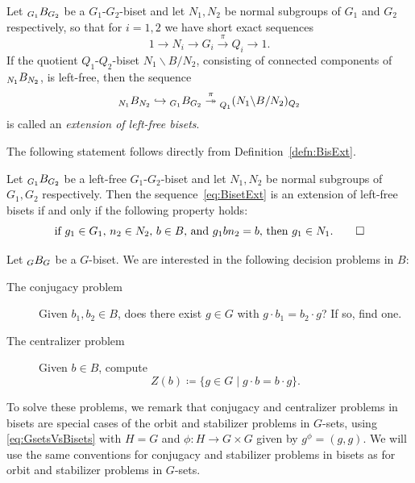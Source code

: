 \documentclass{amsart}
\begin{document}
\begin{defn}\label{defn:BisExt}
  Let $\subscript{G_1}B_{G_2}$ be a $G_1$-$G_2$-biset and let $N_1,N_2$ be
  normal subgroups of $G_1$ and $G_2$ respectively, so that for
  $i=1,2$ we have short exact sequences
  \begin{equation}\label{eq:ExtGr12}
    1\longrightarrow N_i\longrightarrow G_i\overset\pi\longrightarrow Q_i\longrightarrow 1.
  \end{equation}
  If the quotient $Q_1$-$Q_2$-biset $N_1\backslash B/N_2$, consisting
  of connected components of $\subscript{N_1}B_{N_2}$, is left-free, then the
  sequence
  \begin{equation}\label{eq:BisetExt}
    \subscript{N_1}B_{N_2}\hookrightarrow\subscript{G_1}B_{G_2}
    \overset\pi\twoheadrightarrow\subscript{Q_1}(N_1\backslash B/N_2)_{Q_2}
  \end{equation}
  is called an \emph{extension of left-free bisets}.
\end{defn}

\noindent The following statement follows directly from
Definition~\ref{defn:BisExt}.
\begin{prop}\label{prop:ExtOfBis}\pushQED{\qed}
  Let $\subscript{G_1}B_{G_2}$ be a left-free $G_1$-$G_2$-biset and
  let $N_1,N_2$ be normal subgroups of $G_1,G_2$ respectively.  Then
  the sequence~\eqref{eq:BisetExt} is an extension of left-free bisets
  if and only if the following property holds:
  \[\text{if $g_1\in G_1$, $n_2\in N_2$, $b\in B$, and $g_1b n_2=b$,
      then $g_1\in N_1$.}\qedhere\]
\end{prop}

\noindent Let $\subscript G B_G$ be a $G$-biset. We are interested in
the following decision problems in $B$:
\begin{description}
\item[The conjugacy problem] Given $b_1,b_2\in B$, does there exist $g\in
  G$ with $g\cdot b_1=b_2\cdot g$? If so, find one.
\item[The centralizer problem] Given $b\in B$, compute
  \[Z(b)\coloneqq\{g\in G\mid g\cdot b=b\cdot g\}.\]
\end{description}
To solve these problems, we remark that conjugacy and centralizer
problems in bisets are special cases of the orbit and stabilizer
problems in $G$-sets, using \eqref{eq:GsetsVsBisets} with $H=G$ and
$\phi\colon H\to G\times G$ given by $g^\phi=(g,g)$. We will use the
same conventions for conjugacy and stabilizer problems in bisets as
for orbit and stabilizer problems in $G$-sets.
\end{document}
